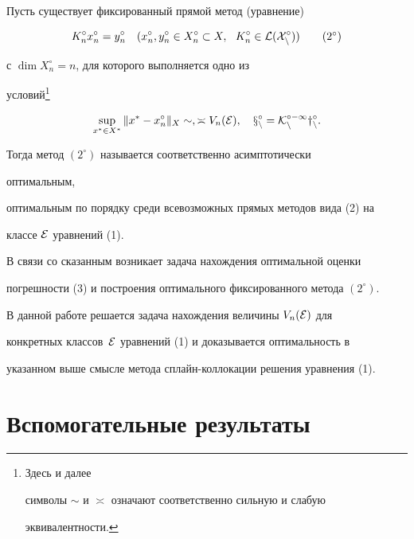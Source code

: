 \begin{defnnonum} 


Пусть существует фиксированный прямой метод (уравнение) 


\begin{equation} 


K^\circ_n x^\circ_n=y^\circ_n\quad (x^\circ_n,y^\circ_n\in X^\circ_n 


\subset X,\ \ K^\circ_n\in\cal L(X^\circ_n))\tag{$2^\circ$} 


\end{equation} 


с $\dim X^\circ_n=n$, для которого выполняется одно из 


условий\footnote{Здесь и далее 


символы $\sim$ и $\asymp$ означают соответственно сильную и слабую 


эквивалентности.} 


$$


\sup_{x^*\in X^*}\|x^*-x^\circ_n\|_X\sim,\asymp V_n(\cal E),\quad 


x^\circ_n=K^{\circ-1}_ny^\circ_n. 


$$


Тогда метод $(2^\circ)$ называется соответственно асимптотически 


оптимальным, 


оптимальным по порядку среди всевозможных прямых методов вида (2) на 


классе $\cal E$ уравнений (1). 


\end{defnnonum} 


 


 


В связи со сказанным возникает задача нахождения оптимальной оценки 


погрешности (3) и построения оптимального фиксированного метода $(2^\circ)$. 


 


В данной работе решается задача нахождения величины $V_n(\cal E)$ для 


конкретных классов~$\cal E$ уравнений (1) и доказывается оптимальность в 


указанном выше смысле метода сплайн-коллокации решения уравнения (1). 


 


 


\section{Вспомогательные результаты} 


